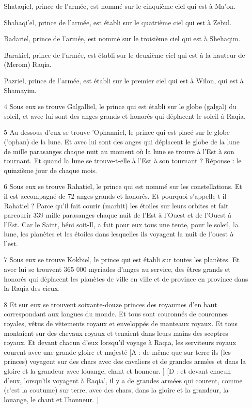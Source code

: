 \par Shataqiel, prince de l'armée, est nommé sur le cinquième ciel qui est à Ma'on.

\par Shahaqi'el, prince de l'armée, est établi sur le quatrième ciel qui est à Zebul.

\par Badariel, prince de l'armée, est nommé sur le troisième ciel qui est à Shehaqim.

\par Barakiel, prince de l'armée, est établi sur le deuxième ciel qui est à la hauteur de (Merom) Raqia.

\par Pazriel, prince de l'armée, est établi sur le premier ciel qui est à Wilon, qui est à Shamayim.

\par 4 Sous eux se trouve Galgalliel, le prince qui est établi sur le globe (galgal) du soleil, et avec lui sont des anges grands et honorés qui déplacent le soleil à Raqia.

\par 5 Au-dessous d'eux se trouve 'Ophanniel, le prince qui est placé sur le globe ('ophan) de la lune. Et avec lui sont des anges qui déplacent le globe de la lune de mille parasanges chaque nuit au moment où la lune se trouve à l'Est à son tournant. Et quand la lune se trouve-t-elle à l’Est à son tournant ? Réponse : le quinzième jour de chaque mois.

\par 6 Sous eux se trouve Rahatiel, le prince qui est nommé sur les constellations. Et il est accompagné de 72 anges grands et honorés. Et pourquoi s'appelle-t-il Rahatiel ? Parce qu'il fait courir (marhit) les étoiles sur leurs orbites et fait parcourir 339 mille parasanges chaque nuit de l'Est à l'Ouest et de l'Ouest à l'Est. Car le Saint, béni soit-Il, a fait pour eux tous une tente, pour le soleil, la lune, les planètes et les étoiles dans lesquelles ils voyagent la nuit de l'ouest à l'est.

\par 7 Sous eux se trouve Kokbiel, le prince qui est établi sur toutes les planètes. Et avec lui se trouvent 365 000 myriades d'anges au service, des êtres grands et honorés qui déplacent les planètes de ville en ville et de province en province dans la Raqia des cieux.

\par 8 Et sur eux se trouvent soixante-douze princes des royaumes d'en haut correspondant aux langues du monde. Et tous sont couronnés de couronnes royales, vêtus de vêtements royaux et enveloppés de manteaux royaux. Et tous montaient sur des chevaux royaux et tenaient dans leurs mains des sceptres royaux. Et devant chacun d'eux lorsqu'il voyage à Raqia, les serviteurs royaux courent avec une grande gloire et majesté [A : de même que sur terre ils (les princes) voyagent sur des chars avec des cavaliers et de grandes armées et dans la gloire et la grandeur avec louange, chant et honneur. ] [D : et devant chacun d'eux, lorsqu'ils voyagent à Raqia', il y a de grandes armées qui courent, comme (c'est la coutume) sur terre, avec des chars, dans la gloire et la grandeur, la louange, le chant et l'honneur. ]


